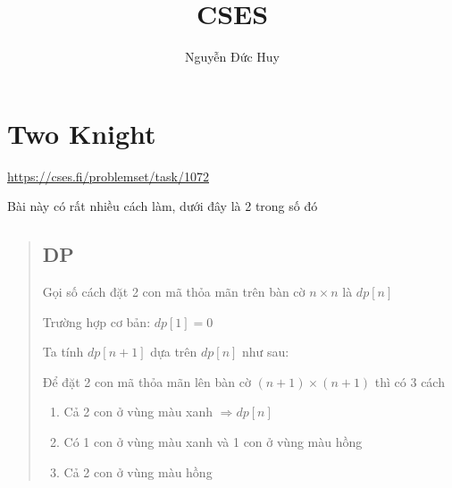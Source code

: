 \documentclass[10pt]{article}
\title{CSES}
\author{Nguyễn Đức Huy}
\begin{document}
\maketitle
\tableofcontents
\newpage

\section{Two Knight}
\indent \url{https://cses.fi/problemset/task/1072}

Bài này có rất nhiều cách làm, dưới đây là 2 trong số đó
\begin{quote}
    \subsection*{DP}
    Gọi số cách đặt 2 con mã thỏa mãn trên bàn cờ $n \times n$ là $dp[n]$

    Trường hợp cơ bản: $dp[1] = 0$

    Ta tính $dp[n + 1]$ dựa trên $dp[n]$ như sau:

    \begin{center}
    \end{center}
    Để đặt 2 con mã thỏa mãn lên bàn cờ $(n + 1) \times  (n + 1)$ thì có 3 cách
    \begin{enumerate}
        \item Cả 2 con ở vùng màu xanh $\Rightarrow dp[n]$
        \item Có 1 con ở vùng màu xanh và 1 con ở vùng màu hồng
        \item Cả 2 con ở vùng màu hồng
    \end{enumerate}


\end{quote}
\end{document}

